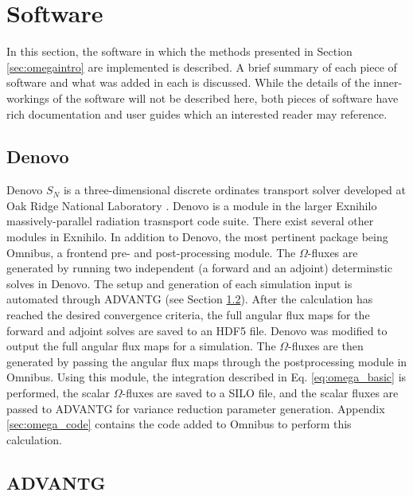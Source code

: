 \section{Software}
\label{sec:software}

In this section, the software in which the methods presented in Section
\ref{sec:omegaintro} are implemented is described.
A brief summary of each piece of
software and what was added in each is discussed.
While the details of the inner-workings of the software will not be described
here, both pieces of software have rich documentation and user guides which an
interested reader may reference.

\subsection{Denovo}

Denovo $S_N$ is a three-dimensional discrete ordinates transport solver
developed at Oak Ridge National Laboratory \cite{evans_denovo:_2010}. Denovo is a module in the larger
Exnihilo massively-parallel radiation trasnsport code suite. There exist several
other modules in Exnihilo. In addition to Denovo, the most pertinent package being
Omnibus, a frontend pre- and post-processing module. The
$\Omega$-fluxes are generated by running two independent (a forward and an
adjoint) determinstic solves
in Denovo. The setup and generation of each
simulation input is automated through ADVANTG (see Section \ref{sec:advantg}).
After the calculation has reached the desired convergence criteria, the
full angular flux maps for the
forward and adjoint solves are saved to an HDF5 \cite{hdf5} file. Denovo was
modified to output the full angular flux maps for a simulation. The
$\Omega$-fluxes are then generated by passing the angular flux maps through the
postprocessing module in Omnibus. Using this module, the integration described in Eq.
\eqref{eq:omega_basic} is performed, the scalar $\Omega$-fluxes are saved
to a SILO file, and the scalar fluxes are passed to ADVANTG for
variance reduction parameter
generation. Appendix \ref{sec:omega_code} contains the code added to Omnibus
to perform this calculation.

\subsection{ADVANTG}
\label{sec:advantg}

